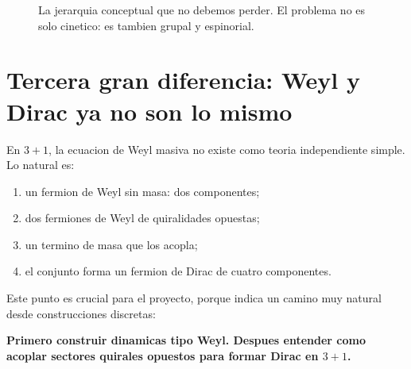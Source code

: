 \begin{figure}[ht]
\centering
{}
\caption{La jerarquia conceptual que no debemos perder. El problema no es solo cinetico: es tambien grupal y espinorial.}
\label{c17:fig:group-ladder}
\end{figure}

\section{Tercera gran diferencia: Weyl y Dirac ya no son lo mismo}

En \(3+1\), la ecuacion de Weyl masiva no existe como teoria independiente simple. Lo natural es:

\begin{enumerate}[leftmargin=*]
  \item un fermion de Weyl sin masa: dos componentes;
  \item dos fermiones de Weyl de quiralidades opuestas;
  \item un termino de masa que los acopla;
  \item el conjunto forma un fermion de Dirac de cuatro componentes.
\end{enumerate}

Este punto es crucial para el proyecto, porque indica un camino muy natural desde construcciones discretas:

\begin{displayquote}
\textbf{Primero construir dinamicas tipo Weyl. Despues entender como acoplar sectores quirales opuestos para formar Dirac en \(3+1\).}
\end{displayquote}

